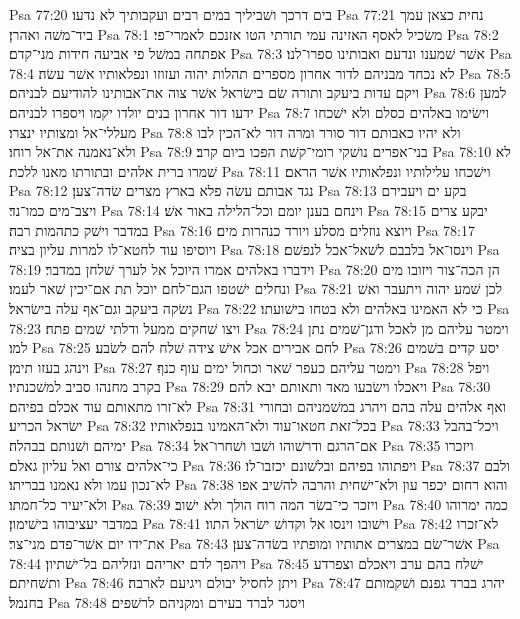 Psa 77:20  בים דרכך ושׁביליך במים רבים ועקבותיך לא נדעו׃
Psa 77:21  נחית כצאן עמך ביד־משׁה ואהרן׃
Psa 78:1  משׂכיל לאסף האזינה עמי תורתי הטו אזנכם לאמרי־פי׃
Psa 78:2  אפתחה במשׁל פי אביעה חידות מני־קדם׃
Psa 78:3  אשׁר שׁמענו ונדעם ואבותינו ספרו־לנו׃
Psa 78:4  לא נכחד מבניהם לדור אחרון מספרים תהלות יהוה ועזוזו ונפלאותיו אשׁר עשׂה׃
Psa 78:5  ויקם עדות ביעקב ותורה שׂם בישׂראל אשׁר צוה את־אבותינו להודיעם לבניהם׃
Psa 78:6  למען ידעו דור אחרון בנים יולדו יקמו ויספרו לבניהם׃
Psa 78:7  וישׂימו באלהים כסלם ולא ישׁכחו מעללי־אל ומצותיו ינצרו׃
Psa 78:8  ולא יהיו כאבותם דור סורר ומרה דור לא־הכין לבו ולא־נאמנה את־אל רוחו׃
Psa 78:9  בני־אפרים נושׁקי רומי־קשׁת הפכו ביום קרב׃
Psa 78:10  לא שׁמרו ברית אלהים ובתורתו מאנו ללכת׃
Psa 78:11  וישׁכחו עלילותיו ונפלאותיו אשׁר הראם׃
Psa 78:12  נגד אבותם עשׂה פלא בארץ מצרים שׂדה־צען׃
Psa 78:13  בקע ים ויעבירם ויצב־מים כמו־נד׃
Psa 78:14  וינחם בענן יומם וכל־הלילה באור אשׁ׃
Psa 78:15  יבקע צרים במדבר וישׁק כתהמות רבה׃
Psa 78:16  ויוצא נוזלים מסלע ויורד כנהרות מים׃
Psa 78:17  ויוסיפו עוד לחטא־לו למרות עליון בציה׃
Psa 78:18  וינסו־אל בלבבם לשׁאל־אכל לנפשׁם׃
Psa 78:19  וידברו באלהים אמרו היוכל אל לערך שׁלחן במדבר׃
Psa 78:20  הן הכה־צור ויזובו מים ונחלים ישׁטפו הגם־לחם יוכל תת אם־יכין שׁאר לעמו׃
Psa 78:21  לכן שׁמע יהוה ויתעבר ואשׁ נשׂקה ביעקב וגם־אף עלה בישׂראל׃
Psa 78:22  כי לא האמינו באלהים ולא בטחו בישׁועתו׃
Psa 78:23  ויצו שׁחקים ממעל ודלתי שׁמים פתח׃
Psa 78:24  וימטר עליהם מן לאכל ודגן־שׁמים נתן למו׃
Psa 78:25  לחם אבירים אכל אישׁ צידה שׁלח להם לשׂבע׃
Psa 78:26  יסע קדים בשׁמים וינהג בעזו תימן׃
Psa 78:27  וימטר עליהם כעפר שׁאר וכחול ימים עוף כנף׃
Psa 78:28  ויפל בקרב מחנהו סביב למשׁכנתיו׃
Psa 78:29  ויאכלו וישׂבעו מאד ותאותם יבא להם׃
Psa 78:30  לא־זרו מתאותם עוד אכלם בפיהם׃
Psa 78:31  ואף אלהים עלה בהם ויהרג במשׁמניהם ובחורי ישׂראל הכריע׃
Psa 78:32  בכל־זאת חטאו־עוד ולא־האמינו בנפלאותיו׃
Psa 78:33  ויכל־בהבל ימיהם ושׁנותם בבהלה׃
Psa 78:34  אם־הרגם ודרשׁוהו ושׁבו ושׁחרו־אל׃
Psa 78:35  ויזכרו כי־אלהים צורם ואל עליון גאלם׃
Psa 78:36  ויפתוהו בפיהם ובלשׁונם יכזבו־לו׃
Psa 78:37  ולבם לא־נכון עמו ולא נאמנו בבריתו׃
Psa 78:38  והוא רחום יכפר עון ולא־ישׁחית והרבה להשׁיב אפו ולא־יעיר כל־חמתו׃
Psa 78:39  ויזכר כי־בשׂר המה רוח הולך ולא ישׁוב׃
Psa 78:40  כמה ימרוהו במדבר יעציבוהו בישׁימון׃
Psa 78:41  וישׁובו וינסו אל וקדושׁ ישׂראל התוו׃
Psa 78:42  לא־זכרו את־ידו יום אשׁר־פדם מני־צר׃
Psa 78:43  אשׁר־שׂם במצרים אתותיו ומופתיו בשׂדה־צען׃
Psa 78:44  ויהפך לדם יאריהם ונזליהם בל־ישׁתיון׃
Psa 78:45  ישׁלח בהם ערב ויאכלם וצפרדע ותשׁחיתם׃
Psa 78:46  ויתן לחסיל יבולם ויגיעם לארבה׃
Psa 78:47  יהרג בברד גפנם ושׁקמותם בחנמל׃
Psa 78:48  ויסגר לברד בעירם ומקניהם לרשׁפים׃
